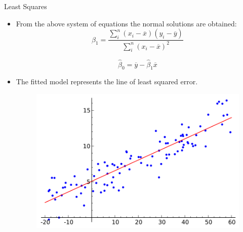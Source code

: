 \documentclass[handout]{beamer}
\begin{document}
\begin{frame}{Least Squares}
\scriptsize{
\begin{itemize}
 \item From the above system of equations the normal solutions are obtained:
  \begin{equation}
 \hat{\beta}_{1} = \frac{\sum_{i}^{n} (x_i-\overline{x})(y_i-\overline{y}) }{ \sum_{i}^{n} (x_i-\overline{x})^2}    
 \end{equation}

 \begin{equation}
 \hat{\beta}_{0} = \overline{y} -\hat{\beta}_{1}\overline{x}    
 \end{equation}



\item The fitted model represents the line of least squared error.

\begin{figure}[h!]
	\centering
	\includegraphics[scale=0.35]{pics/Linear_regression.png}
\end{figure}

\end{itemize}

} 
 
\end{frame}
\end{document}
